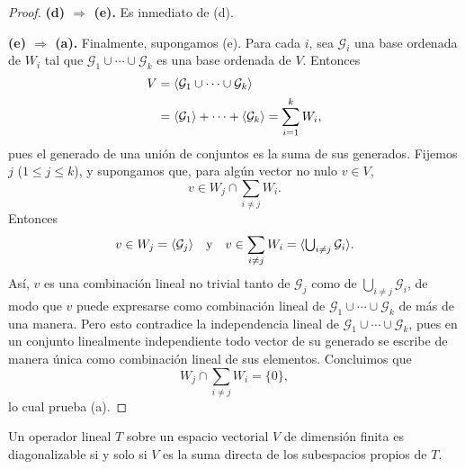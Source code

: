 \documentclass[12pt,a4paper]{book}
\begin{document}
\begin{proof}
        \textbf{(d) $\Rightarrow$ (e).} Es inmediato de (d).

        \textbf{(e) $\Rightarrow$ (a).} Finalmente, supongamos (e). Para cada $i$, sea $\mathcal{G}_i$ una base ordenada de $W_i$ tal que $\mathcal{G}_1\cup\cdots\cup\mathcal{G}_k$ es una base ordenada de $V$. Entonces
        \begin{align*}
            V&=\langle \mathcal{G}_1\cup\cdots\cup\mathcal{G}_k \rangle\\
            &=\langle \mathcal{G}_1 \rangle+\cdots+\langle \mathcal{G}_k \rangle=\sum_{i=1}^{k}W_i,
        \end{align*}
        pues el generado de una unión de conjuntos es la suma de sus generados. Fijemos $j$ ($1\leq j\leq k$), y supongamos que, para algún vector no nulo $v\in V$,
        \begin{equation*}
            v\in W_j\cap\sum_{i\neq j}W_i.
        \end{equation*}
        Entonces
        \begin{equation*}
            v\in W_j=\langle \mathcal{G}_j \rangle
            \quad\text{y}\quad
            v\in\sum_{i\neq j}W_i=\langle \textstyle\bigcup_{i\neq j}\mathcal{G}_i \rangle.
        \end{equation*}
        Así, $v$ es una combinación lineal no trivial tanto de $\mathcal{G}_j$ como de $\bigcup_{i\neq j}\mathcal{G}_i$, de modo que $v$ puede expresarse como combinación lineal de $\mathcal{G}_1\cup\cdots\cup\mathcal{G}_k$ de más de una manera. Pero esto contradice la independencia lineal de $\mathcal{G}_1\cup\cdots\cup\mathcal{G}_k$, pues en un conjunto linealmente independiente todo vector de su generado se escribe de manera única como combinación lineal de sus elementos. Concluimos que
        \begin{equation*}
            W_j\cap\sum_{i\neq j}W_i=\{0\},
        \end{equation*}
        lo cual prueba (a).
    \end{proof}

    \begin{teorema}
        Un operador lineal $T$ sobre un espacio vectorial $V$ de dimensión finita es diagonalizable si y solo si $V$ es la suma directa de los subespacios propios de $T$.
    \end{teorema}
\end{document}
